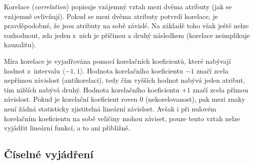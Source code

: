 \begin{compactitem}
    \item Korelace (\textit{correlation}) popisuje vzájemný vztah mezi dvěma atributy (jak se vzájemně ovlivňují). Pokud se mezi dvěma atributy potvrdí korelace, je pravděpodobné, že jsou atributy na sobě závislé. Na základě toho však ještě nelze rozhodnout, zda jeden z~nich je příčinou a druhý následkem (korelace neimplikuje kauzalitu).

    \item Míra korelace je vyjadřována pomocí korelačních koeficientů, které nabývají hodnot z~intervalu $\langle-1,1\rangle$. Hodnota korelačního koeficientu $-1$ značí zcela nepřímou závislost (antikorelaci), tedy čím vyšších hodnot nabývá jeden atribut, tím nižších nabývá druhý. Hodnota korelačního koeficientu $+1$ značí zcela přímou závislost. Pokud je korelační koeficient roven 0 (nekorelovanost), pak mezi znaky není žádná statisticky zjistitelná lineární závislost. Avšak i při nulovém korelačním koeficientu na sobě veličiny mohou záviset, pouze tento vztah nelze vyjádřit lineární funkcí, a to ani přibližně.
\end{compactitem}

\subsection{Číselné vyjádření}

